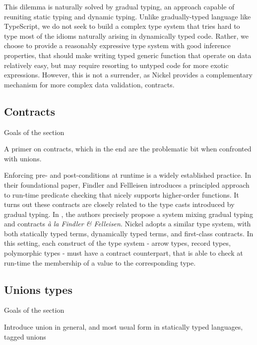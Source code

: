 \documentclass{article}
\begin{document}
This dilemma is naturally solved by gradual typing\cite{Siek06gradualtyping}, an
approach capable of reuniting static typing and dynamic typing. Unlike
gradually-typed language like TypeScript, we do not seek to build a complex type
system that tries hard to type most of the idioms naturally arising in
dynamically typed code.  Rather, we choose to provide a reasonably expressive
type system with good inference properties, that should make writing typed
generic function that operate on data relatively easy, but may require resorting
to untyped code for more exotic expressions.  However, this is not a surrender,
as Nickel provides a complementary mechanism for more complex data validation,
contracts.

\subsection{Contracts}
\color{red}Goals of the section

A primer on contracts, which in the end are the problematic bit when confronted
with unions.\vspace{0.5cm}

Enforcing pre- and post-conditions at runtime is a widely established practice.
In their foundational paper\cite{FindlerFelleisenHOContracts}, Findler and
Fellleisen introduces a principled approach to run-time predicate checking that
nicely supports higher-order functions. It turns out these contracts are closely
related to the type casts introduced by gradual typing. In
\cite{WellTypedBlamed}, the authors precisely propose a system mixing gradual
typing and contracts \textit{à la Findler \& Felleisen}. Nickel adopts a similar
type system, with both statically typed terms, dynamically typed terms, and
first-class contracts. In this setting, each construct of the type system -
arrow types, record types, polymorphic types - must have a contract counterpart,
that is able to check at run-time the membership of a value to the corresponding
type.

\color{black}


\subsection{Unions types}
\color{red}Goals of the section

Introduce union in general, and most usual form in statically typed languages, tagged unions\vspace{0.5cm}\color{black}
\end{document}
